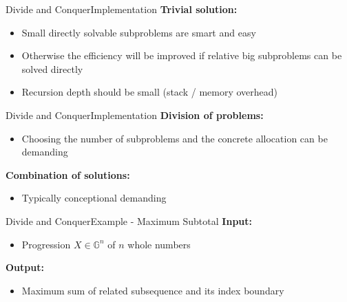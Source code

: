 
\begin{frame}{Divide and Conquer}{Implementation}
  \textbf{Trivial solution:}
  \begin{itemize}
    \item
      Small directly solvable subproblems are smart and easy
    \item
      Otherwise the efficiency will be improved if relative big subproblems
      can be solved directly
    \item
      Recursion depth should be small (stack / memory overhead)
  \end{itemize}
\end{frame}


\begin{frame}{Divide and Conquer}{Implementation}
  \textbf{Division of problems:}
  \begin{itemize}
    \item
      Choosing the number of subproblems and the concrete allocation can be
      demanding
  \end{itemize}
  \vspace{1em}
  \textbf{Combination of solutions:}
  \begin{itemize}
    \item
      Typically conceptional demanding
  \end{itemize}
\end{frame}


\begin{frame}{Divide and Conquer}{Example - Maximum Subtotal}
  \textbf{Input:}
  \begin{itemize}
    \item
      Progression $X \in \mathbb{G}^n$ of $n$ whole numbers
  \end{itemize}
  \textbf{Output:}
  \begin{itemize}
    \item
      Maximum sum of related subsequence and its index boundary
  \end{itemize}
\end{frame}


